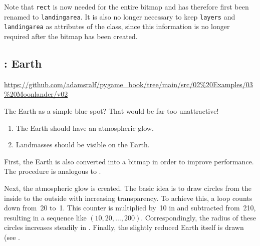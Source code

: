 Note that \texttt{rect} is now needed for the entire bitmap and has therefore first been renamed to \texttt{landingarea}. It is also no longer necessary to keep \texttt{layers} and \texttt{landingarea} as attributes of the class, since this information is no longer required after the bitmap has been created.



\subsection{: Earth}
\begin{diskbox}
	\url{https://github.com/adamsralf/pygame_book/tree/main/src/02%20Examples/03%20Moonlander/v02}
\end{diskbox}
The Earth as a simple blue spot? That would be far too unattractive!

\begin{enumerate}
	\item The Earth should have an atmospheric glow.\label{reqEarthKranz}
	\item Landmasses should be visible on the Earth.\label{reqEarthLand}
\end{enumerate}
\er

First, the Earth is also converted into a bitmap in order to improve performance. The procedure is analogous to .

\newpage
{}

Next, the atmospheric glow is created. The basic idea is to draw circles from the inside to the outside with increasing transparency. To achieve this, a loop counts down from~20 to~1. This counter is multiplied by~10 in  and subtracted from~210, resulting in a sequence like $(10, 20, \ldots, 200)$. Correspondingly, the radius of these circles increases steadily in . Finally, the slightly reduced Earth itself is drawn (see .

